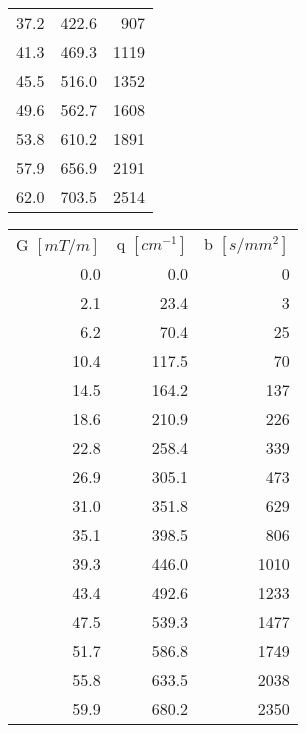\begin{table}
{\begin{tabular}{rrr}
                37.2  & 422.6 & 907 \\
                41.3  & 469.3 & 1119 \\
                45.5  & 516.0 & 1352 \\
                49.6  & 562.7 & 1608 \\
                53.8  & 610.2 & 1891 \\
                57.9  & 656.9 & 2191 \\
                62.0  & 703.5 & 2514 \\
                \bottomrule
            \end{tabular}%
            \hspace{0.2cm}%
            \begin{tabular}{rrr}
            \addlinespace
                \multicolumn{3}{l}{\textit{... continued}}\\
            \toprule
                G $[mT/m]$ & q $[cm^{-1}]$ & b $[s/mm^2]$ \\
                \cmidrule(r){1-1}\cmidrule(lr){2-2}\cmidrule(l){3-3}
                0.0   & 0.0   & 0 \\
                2.1   & 23.4  & 3 \\
                6.2   & 70.4  & 25 \\
                10.4  & 117.5 & 70 \\
                14.5  & 164.2 & 137 \\
                18.6  & 210.9 & 226 \\
                22.8  & 258.4 & 339 \\
                26.9  & 305.1 & 473 \\
                31.0  & 351.8 & 629 \\
                35.1  & 398.5 & 806 \\
                39.3  & 446.0 & 1010 \\
                43.4  & 492.6 & 1233 \\
                47.5  & 539.3 & 1477 \\
                51.7  & 586.8 & 1749 \\
                55.8  & 633.5 & 2038 \\
                59.9  & 680.2 & 2350 \\
                \bottomrule
            \end{tabular}%
     }
     \label{tab:chapter6 QSI protocol}
\end{table}



